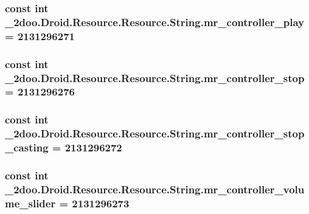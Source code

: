 \hypertarget{class__2doo_1_1_droid_1_1_resource_1_1_string_46e3efc97eef631ddcf532d02b52ae85}{
\subsubsection[{mr\_\-controller\_\-play}]{\setlength{\rightskip}{0pt plus 5cm}const int \_\-2doo.Droid.Resource.Resource.String.mr\_\-controller\_\-play = 2131296271}}
\label{class__2doo_1_1_droid_1_1_resource_1_1_string_46e3efc97eef631ddcf532d02b52ae85}


\hypertarget{class__2doo_1_1_droid_1_1_resource_1_1_string_618027e879ba7b226e9b915df0961188}{
\subsubsection[{mr\_\-controller\_\-stop}]{\setlength{\rightskip}{0pt plus 5cm}const int \_\-2doo.Droid.Resource.Resource.String.mr\_\-controller\_\-stop = 2131296276}}
\label{class__2doo_1_1_droid_1_1_resource_1_1_string_618027e879ba7b226e9b915df0961188}


\hypertarget{class__2doo_1_1_droid_1_1_resource_1_1_string_7fd2c48559870d0e0628b8054904ca2c}{
\subsubsection[{mr\_\-controller\_\-stop\_\-casting}]{\setlength{\rightskip}{0pt plus 5cm}const int \_\-2doo.Droid.Resource.Resource.String.mr\_\-controller\_\-stop\_\-casting = 2131296272}}
\label{class__2doo_1_1_droid_1_1_resource_1_1_string_7fd2c48559870d0e0628b8054904ca2c}


\hypertarget{class__2doo_1_1_droid_1_1_resource_1_1_string_f08fc0ec64fe7cf8e80f3c2154d0a3c5}{
\subsubsection[{mr\_\-controller\_\-volume\_\-slider}]{\setlength{\rightskip}{0pt plus 5cm}const int \_\-2doo.Droid.Resource.Resource.String.mr\_\-controller\_\-volume\_\-slider = 2131296273}}
\label{class__2doo_1_1_droid_1_1_resource_1_1_string_f08fc0ec64fe7cf8e80f3c2154d0a3c5}


